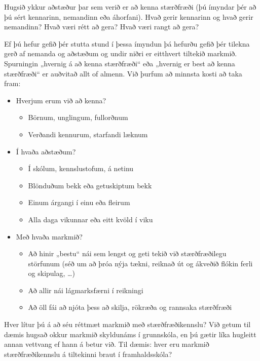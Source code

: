 \documentclass[
  icelandic,
]{book}
\providecommand{\tightlist}{%
  \setlength{\itemsep}{0pt}\setlength{\parskip}{0pt}}
\begin{document}
Hugsið ykkur aðstæður þar sem verið er að kenna stærðfræði (þú ímyndar þér að þú sért kennarinn, nemandinn eða áhorfani). Hvað gerir kennarinn og hvað gerir nemandinn? Hvað væri rétt að gera? Hvað væri rangt að gera?

Ef þú hefur gefið þér stutta stund í þessa ímyndun þá hefurðu gefið þér tilekna gerð af nemanda og aðstæðum og undir niðri er eitthvert tiltekið markmið. Spurningin „hvernig á að kenna stærðfræði`` eða „hvernig er best að kenna stærðfræði`` er auðvitað allt of almenn. Við þurfum að minnsta kosti að taka fram:

\begin{itemize}
\tightlist
\item
  Hverjum erum við að kenna?

  \begin{itemize}
  \tightlist
  \item
    Börnum, unglingum, fullorðnum
  \item
    Verðandi kennurum, starfandi læknum
  \end{itemize}
\item
  Í hvaða aðstæðum?

  \begin{itemize}
  \tightlist
  \item
    Í skólum, kennslustofum, á netinu
  \item
    Blönduðum bekk eða getuskiptum bekk
  \item
    Einum árgangi í einu eða fleirum
  \item
    Alla daga vikunnar eða eitt kvöld í viku
  \end{itemize}
\item
  Með hvaða markmið?

  \begin{itemize}
  \tightlist
  \item
    Að hinir „bestu`` nái sem lengst og geti tekið við stærðfræðilegu störfunum (séð um að þróa nýja tækni, reiknað út og ákveðið flókin ferli og skipulag, \ldots)
  \item
    Að allir nái lágmarksfærni í reikningi
  \item
    Að öll fái að njóta þess að skilja, rökræða og rannsaka stærðfræði
  \end{itemize}
\end{itemize}

Hver lítur þú á að séu réttmæt markmið með stærðfræðikennslu? Við getum til dæmis hugsað okkur markmið skyldunáms í grunnskóla, en þú gætir líka hugleitt annan vettvang ef hann á betur við. Til dæmis: hver eru markmið stærðfræðikennslu á tiltekinni braut í framhaldsskóla?
\end{document}
